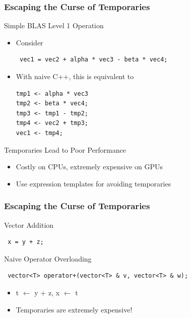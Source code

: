 \begin{frame}[fragile]
\frametitle{Escaping the Curse of Temporaries}

 \begin{block}{Simple BLAS Level 1 Operation}
  \begin{itemize}
   \item Consider
  {\black \begin{lstlisting}
 vec1 = vec2 + alpha * vec3 - beta * vec4;
  \end{lstlisting} }

    \item  With naive C++, this is equivalent to
  {\black \begin{lstlisting}
tmp1 <- alpha * vec3
tmp2 <- beta * vec4;
tmp3 <- tmp1 - tmp2;
tmp4 <- vec2 + tmp3;
vec1 <- tmp4;
  \end{lstlisting} }
  \end{itemize}
  
 \end{block}

  \begin{block}{Temporaries Lead to Poor Performance}
    \begin{itemize}
     \item Costly on CPUs, extremely expensive on GPUs
     \item Use expression templates for avoiding temporaries
    \end{itemize}
  \end{block}
  
\vspace*{0.3cm}
\end{frame}




\begin{frame}[fragile]
\frametitle{Escaping the Curse of Temporaries}

 \begin{block}{Vector Addition}
  \begin{lstlisting}
 x = y + z;
  \end{lstlisting}
 \end{block}


 \begin{block}{Naive Operator Overloading}
  \begin{lstlisting}
 vector<T> operator+(vector<T> & v, vector<T> & w);
  \end{lstlisting}


  \begin{itemize}
   \item t $\leftarrow$ y + z, x $\leftarrow$ t
   \item Temporaries are extremely expensive! 
  \end{itemize}
 \end{block}




\end{frame}



